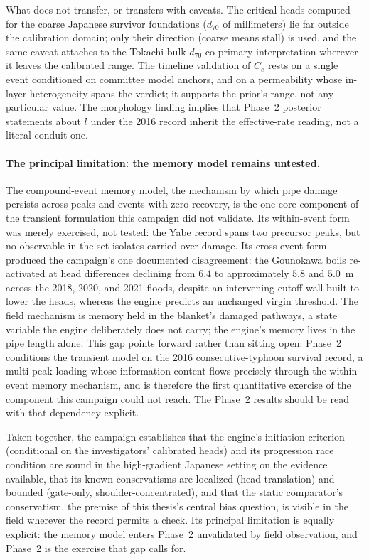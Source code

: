 What does not transfer, or transfers with caveats. The critical heads
computed for the coarse Japanese survivor foundations ($d_{70}$ of
millimeters) lie far outside the \textcite{sellmeijer_2011} calibration
domain; only their direction (coarse means stall) is used, and the same
caveat attaches to the Tokachi bulk-$d_{70}$ co-primary interpretation
wherever it leaves the calibrated range. The timeline validation of $C_e$
rests on a single event conditioned on committee model anchors, and on a
permeability whose in-layer heterogeneity spans the verdict; it supports
the prior's range, not any particular value. The morphology finding implies
that Phase~2 posterior statements about $l$ under the 2016 record inherit
the effective-rate reading, not a literal-conduit one.

\paragraph{The principal limitation: the memory model remains untested.}
The compound-event memory model, the mechanism by which pipe damage
persists across peaks and events with zero recovery, is the one core
component of the transient formulation this campaign did not validate. Its
within-event form was merely exercised, not tested: the Yabe record spans
two precursor peaks, but no observable in the set isolates carried-over
damage. Its cross-event form produced the campaign's one documented
disagreement: the Gounokawa boils re-activated at head differences
declining from $6.4$ to approximately $5.8$ and $5.0$~m across the 2018,
2020, and 2021 floods, despite an intervening cutoff wall built to lower
the heads, whereas the engine predicts an unchanged virgin threshold. The
field mechanism is memory held in the blanket's damaged pathways, a state
variable the engine deliberately does not carry; the engine's memory lives
in the pipe length alone. This gap points forward rather than sitting
open: Phase~2 conditions the transient model on the 2016 consecutive-typhoon
survival record, a multi-peak loading whose information content flows
precisely through the within-event memory mechanism, and is therefore the
first quantitative exercise of the component this campaign could not reach.
The Phase~2 results should be read with that dependency explicit.

Taken together, the campaign establishes that the engine's initiation
criterion (conditional on the investigators' calibrated heads) and its
progression race condition are sound in the high-gradient Japanese setting
on the evidence available, that its known conservatisms are localized (head
translation) and bounded (gate-only, shoulder-concentrated), and that the
static comparator's conservatism, the premise of this thesis's central bias
question, is visible in the field wherever the record permits a check. Its
principal limitation is equally explicit: the memory model enters Phase~2
unvalidated by field observation, and Phase~2 is the exercise that gap
calls for.
